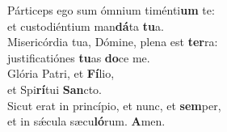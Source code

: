 \oddverse Párticeps ego sum ómnium timénti\textbf{um} te:~\*\\
\oddverse et custodiéntium man\textbf{dá}ta \textbf{tu}a.\\
\evenverse Misericórdia tua, Dómine, plena est \textbf{ter}ra:~\*\\
\evenverse justificatiónes \textbf{tu}as \textbf{do}ce me.\\
\oddverse Glória Patri, et \textbf{Fí}lio,~\*\\
\oddverse et Spi\textbf{rí}tui \textbf{San}cto.\\
\evenverse Sicut erat in princípio, et nunc, et \textbf{sem}per,~\*\\
\evenverse et in sǽcula sæcu\textbf{ló}rum. \textbf{A}men.\\

